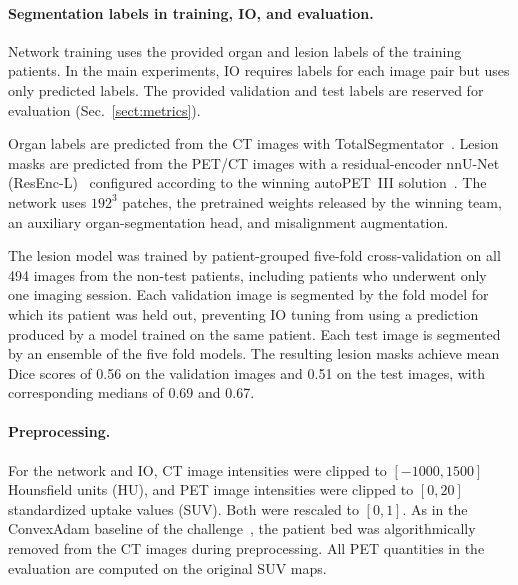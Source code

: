 \paragraph{Segmentation labels in training, IO, and evaluation.}
Network training uses the provided organ and lesion labels of the training patients.
In the main experiments, IO requires labels for each image pair but uses only predicted labels.
The provided validation and test labels are reserved for evaluation (Sec.~\ref{sect:metrics}).

Organ labels are predicted from the CT images with TotalSegmentator~\cite{ref_totalsegmentator}.
Lesion masks are predicted from the PET/CT images with a residual-encoder nnU-Net (ResEnc-L)~\cite{nnunet} configured according to the winning autoPET~III solution~\cite{rokuss2024fdgpsmahitchhikersguide}.
The network uses $192^3$ patches, the pretrained weights released by the winning team, an auxiliary organ-segmentation head, and misalignment augmentation.

The lesion model was trained by patient-grouped five-fold cross-validation on all 494 images from the non-test patients, including patients who underwent only one imaging session.
Each validation image is segmented by the fold model for which its patient was held out, preventing IO tuning from using a prediction produced by a model trained on the same patient.
Each test image is segmented by an ensemble of the five fold models.
The resulting lesion masks achieve mean Dice scores of 0.56 on the validation images and 0.51 on the test images, with corresponding medians of 0.69 and 0.67.


\paragraph{Preprocessing.}
For the network and IO, CT image intensities were clipped to $[-1000,1500]$ Hounsfield units (HU), and PET image intensities were clipped to $[0,20]$ standardized uptake values (SUV).
Both were rescaled to $[0,1]$.
As in the ConvexAdam baseline of the challenge~\cite{ref_convexadam}, the patient bed was algorithmically removed from the CT images during preprocessing.
All PET quantities in the evaluation are computed on the original SUV maps.

